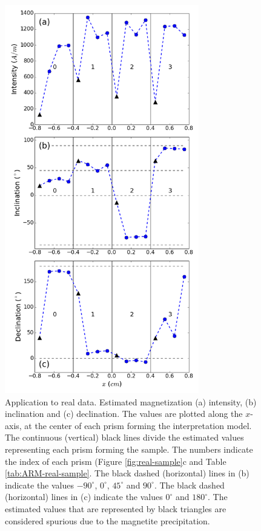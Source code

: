 \documentclass[galley,gc]{agutex}
\begin{document}
 \begin{figure}
 \noindent \includegraphics[width=20pc]{Figs/Fig15_LQ.png}
 \caption{Application to real data. Estimated magnetization 
 (a) intensity, (b) inclination and (c) declination.
 The values are plotted along the $x$-axis, at the center of each 
 prism forming the interpretation model.
 The continuous (vertical) black lines divide the estimated values 
 representing each prism forming the sample.
 The numbers indicate the index of each prism 
 (Figure \ref{fig:real-sample}c and Table \ref{tab:ARM-real-sample}.
 The black dashed (horizontal) lines in (b) indicate the values 
 $-90^{\circ}$, $0^{\circ}$, $45^{\circ}$ and $90^{\circ}$.
 The black dashed (horizontal) lines in (c) indicate the values 
 $0^{\circ}$ and $180^{\circ}$.
 The estimated values that are represented by black triangles are
 considered spurious due to the magnetite precipitation.}
 \label{fig:estimate-real}
 \end{figure}
\end{document}
